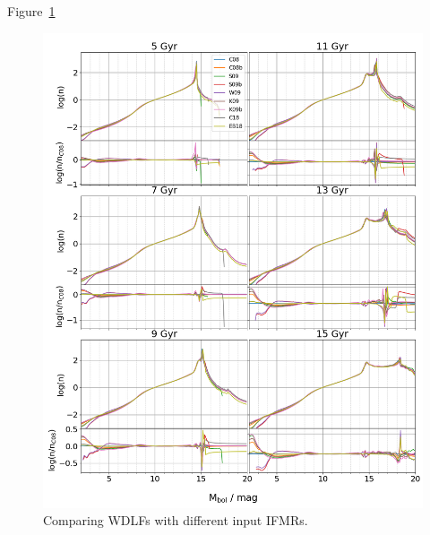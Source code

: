 \documentclass[fleqn,usenatbib]{rasti}
\begin{document}
Figure~\ref{fig:wdlf_compare_ifmr}
\begin{figure}
    \centering
    \includegraphics[width=\textwidth]{wdlf_compare_ifmr.png}
    \caption{Comparing WDLFs with different input IFMRs.}
    \label{fig:wdlf_compare_ifmr}
\end{figure}
\end{document}
